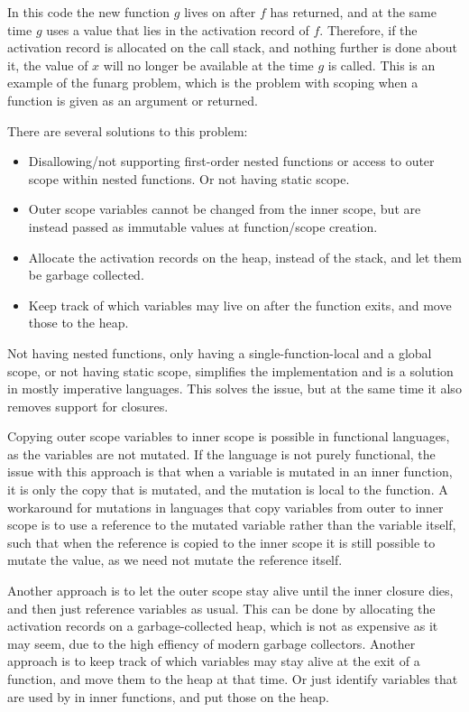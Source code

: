 \documentclass[11pt]{report}
\begin{document}
In this code the new function $g$ lives on after $f$ has returned, and at the same time $g$ uses a value that lies in the activation record of $f$. Therefore, if the activation record is allocated on the call stack, and nothing further is done about it, the value of $x$ will no longer be available at the time $g$ is called.
This is an example of the funarg problem, which is the problem with scoping when a function is given as an argument or returned.
\label{funarg}

There are several solutions to this problem:
\begin{itemize}
\item Disallowing/not supporting first-order nested functions or access to outer scope within nested functions. Or not having static scope.
\item Outer scope variables cannot be changed from the inner scope, but are instead passed as immutable values at function/scope creation. 
\item Allocate the activation records on the heap, instead of the stack, and let them be garbage collected. 
\item Keep track of which variables may live on after the function exits, and move those to the heap.
\end{itemize}

Not having nested functions, only having a single-function-local and a global scope, or not having static scope, simplifies the implementation and is a solution in mostly imperative languages.
This solves the issue, but at the same time it also removes support for closures.

Copying outer scope variables to inner scope is possible in functional languages, as the variables are not mutated. If the language is not purely functional, the issue with this approach is that when a variable is mutated in an inner function, it is only the copy that is mutated, and the mutation is local to the function.
A workaround for mutations in languages that copy variables from outer to inner scope is to use a reference to the mutated variable rather than the variable itself, such that when the reference is copied to the inner scope it is still possible to mutate the value, as we need not mutate the reference itself.

Another approach is to let the outer scope stay alive until the inner closure dies, and then just reference variables as usual.
This can be done by allocating the activation records on a garbage-collected heap,
which is not as expensive as it may seem, due to the high effiency of modern garbage collectors.
Another approach is to keep track of which variables may stay alive at the exit of a function, and move them to the heap at that time.
Or just identify variables that are used by in inner functions, and put those on the heap.
\end{document}
